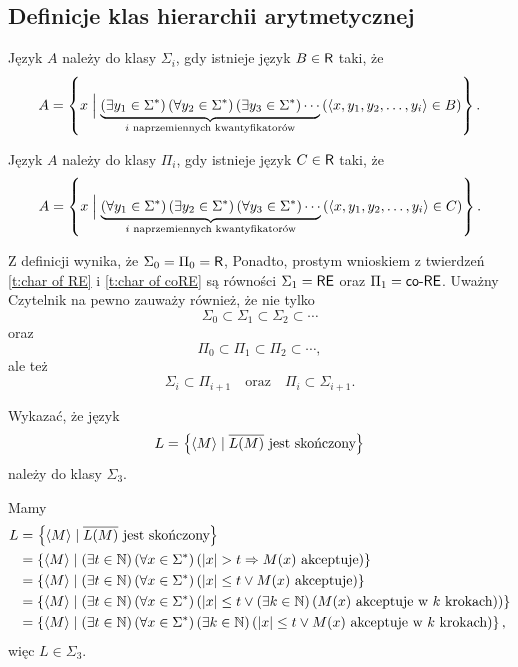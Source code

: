 \subsection{Definicje klas hierarchii arytmetycznej}

\begin{definition}
    Język $A$ należy do klasy $\Sigma_i$, gdy istnieje język $B \in \textsf{R}$ taki, że
    \[ A = \left\{x \Bigm|
    \underbrace{\left(\exists y_1 \in \Sigma^*\right) \left(\forall y_2 \in \Sigma^*\right) \left(\exists y_3 \in \Sigma^*\right) \cdots}_{i \text{ naprzemiennych kwantyfikatorów}}
    \left(\left\langle x, y_1, y_2, \ldots, y_i \right\rangle \in B\right)\right\}. \]
\end{definition}

\begin{definition}[klasa $\Pi_i$]
    Język $A$ należy do klasy $\Pi_i$, gdy istnieje język $C \in \textsf{R}$ taki, że
    \[ A = \left\{x \Bigm|
    \underbrace{\left(\forall y_1 \in \Sigma^*\right) \left(\exists y_2 \in \Sigma^*\right) \left(\forall y_3 \in \Sigma^*\right) \cdots}_{i \text{ naprzemiennych kwantyfikatorów}}
    \left(\left\langle x, y_1, y_2, \ldots, y_i \right\rangle \in C\right)\right\}. \]
\end{definition}

Z definicji wynika, że $\Sigma_0 = \Pi_0 = \textsf{R}$, Ponadto, prostym wnioskiem z twierdzeń \ref{t:char of RE} i \ref{t:char of coRE} są równości $\Sigma_1 = \textsf{RE}$ oraz $\Pi_1 = \textsf{co-RE}$. Uważny Czytelnik na pewno zauważy również, że nie tylko
\[ \Sigma_0 \subset \Sigma_1 \subset \Sigma_2 \subset \cdots \]
oraz
\[ \Pi_0 \subset \Pi_1 \subset \Pi_2 \subset \cdots, \]
ale też
\[ \Sigma_i \subset \Pi_{i + 1} \quad\text{oraz}\quad \Pi_i \subset \Sigma_{i+1}. \]

\begin{example}
    Wykazać, że język
    \[ L = \left\{\left\langle M \right\rangle \mid \overline{L(M)} \text{ jest skończony}\right\} \]
    należy do klasy $\Sigma_3$.
\end{example}
\begin{solution}
Mamy
    \begin{align*}
        L &= \left\{\left\langle M \right\rangle \mid \overline{L(M)} \text{ jest skończony}\right\} \\
        &= \left\{\left\langle M \right\rangle \mid \left(\exists t \in \mathbb N\right) \left(\forall x \in \Sigma^*\right) \left(|x| > t \Rightarrow M(x) \text{ akceptuje}\right)\right\} \\
        &= \left\{\left\langle M \right\rangle \mid \left(\exists t \in \mathbb N\right) \left(\forall x \in \Sigma^*\right) \left(|x| \leq t \lor M(x) \text{ akceptuje}\right)\right\} \\
        &= \left\{\left\langle M \right\rangle \mid \left(\exists t \in \mathbb N\right) \left(\forall x \in \Sigma^*\right) \left(|x| \leq t \lor \left(\exists k \in \mathbb N\right) \left(M(x) \text{ akceptuje w } k \text{ krokach}\right)\right)\right\} \\
        &= \left\{\left\langle M \right\rangle \mid \left(\exists t \in \mathbb N\right) \left(\forall x \in \Sigma^*\right) \left(\exists k \in \mathbb N\right) \left(|x| \leq t \lor M(x) \text{ akceptuje w } k \text{ krokach}\right)\right\},
    \end{align*}
    więc $L \in \Sigma_3$.
\end{solution}

